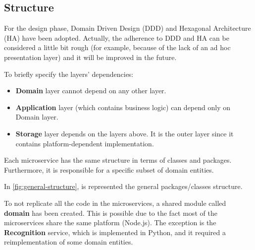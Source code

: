 \documentclass{scrartcl}
\begin{document}
    \subsection{Structure}

%

    For the design phase, Domain Driven Design (DDD) and Hexagonal Architecture (HA) have been adopted.
    Actually, the adherence to DDD and HA can be considered a little bit rough (for example, because of the lack of an ad hoc presentation layer) and it will be improved in the future.

    To briefly specify the layers' dependencies:
    \begin{itemize}
        \item \textbf{Domain} layer cannot depend on any other layer.
        \item \textbf{Application} layer (which contains business logic) can depend only on Domain layer.
        \item \textbf{Storage} layer depends on the layers above.
        It is the outer layer since it contains platform-dependent implementation.
    \end{itemize}

    Each microservice has the same structure in terms of classes and packages.
    Furthermore, it is responsible for a specific subset of domain entities.

    In \cref{fig:general-structure}, is represented the general packages/classes structure.

    To not replicate all the code in the microservices, a shared module called \textbf{domain} has been created.
    This is possible due to the fact most of the microservices share the same platform (Node.js).
    The exception is the \textbf{Recognition} service, which is implemented in Python, and it required a reimplementation of some domain entities.
\end{document}
